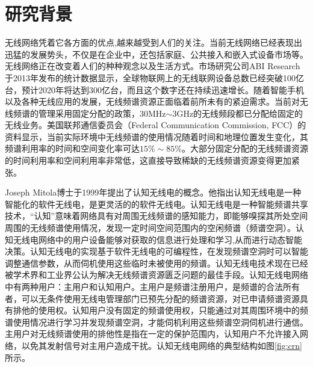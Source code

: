 
\chapter{研究背景}
\label{chap:introduction}




无线网络凭着它各方面的优点,越来越受到人们的关注。当前无线网络已经表现出迅猛的发展势头，不仅是在企业中，还包括家庭、公共接入和嵌入式设备市场等。无线网络正在改变着人们的种种观念以及生活方式。市场研究公司ABI Research于2013年发布的统计数据显示，全球物联网上的无线联网设备总数已经突破100亿台，预计2020年将达到300亿台，而且这个数字还在持续迅速增长。随着智能手机以及各种无线应用的发展，无线频谱资源正面临着前所未有的紧迫需求。当前对无线频谱的管理采用固定分配的政策，30MHz$\sim$3GHz的无线频段都已分配给固定的无线业务。美国联邦通信委员会（Federal Communication Commission, FCC）的资料显示，当前实际环境中无线频谱的使用情况随着时间和地理位置发生变化，其频谱利用率的时间和空间变化率可达$15\% \sim 85\%$\cite{akyildiz2006next}。大部分固定分配的无线频谱资源的时间利用率和空间利用率非常低，这直接导致稀缺的无线频谱资源变得更加紧张。

Joseph Mitola博士于1999年提出了认知无线电的概念\cite{mitola1999cognitive}。他指出认知无线电是一种智能化的软件无线电，是更灵活的的软件无线电。认知无线电是一种智能频谱共享技术，“认知”意味着网络具有对周围无线频谱的感知能力，即能够嗅探其所处空间周围的无线频谱使用情况，发现一定时间空间范围内的空闲频谱（频谱空洞）。认知无线电网络中的用户设备能够对获取的信息进行处理和学习,从而进行动态智能决策。认知无线电的实现基于软件无线电的可编程性，在发现频谱空洞时可以智能调整通信参数，从而伺机使用这些临时未被使用的频谱。认知无线电技术现在已经被学术界和工业界公认为解决无线频谱资源匮乏问题的最佳手段。认知无线电网络中有两种用户：主用户和认知用户。主用户是频谱注册用户，是频谱的合法所有者，可以无条件使用无线电管理部门已预先分配的频谱资源，对已申请频谱资源具有排他的使用权。认知用户没有固定的频谱使用权，只能通过对其周围环境中的频谱使用情况进行学习并发现频谱空洞，才能伺机利用这些频谱空洞伺机进行通信。主用户对无线频谱使用的排他性是指在一定的保护范围内，认知用户不允许接入网络，以免其发射信号对主用户造成干扰。认知无线电网络的典型结构如图\ref{fig:crn}所示。

